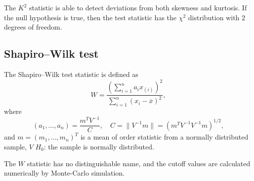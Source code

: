         \begin{remark}
            The $K^2$ statistic is able to detect deviations from both skewness and kurtosis. 
            If the null hypothesis is true, then the test statistic has the $\chi^2$ 
            distribution with $2$ degrees of freedom. 
        \end{remark}

    \subsection{Shapiro--Wilk test}
        \begin{definition}
            The Shapiro--Wilk test statistic is defined as
            \begin{equation}
                W = \frac{\left(\sum_{i=1}^n a_i x_{(i)}\right)^2 }{\sum_{i=1}^n (x_i-\overline{x})^2},
            \end{equation}
            where
            \begin{equation*}
                (a_1, \dots, a_n) = \frac{m^{T} V^{-1}}{C}, \quad C = \| V^{-1} m \| = (m^{T} V^{-1}V^{-1}m)^{1/2},
            \end{equation*}
            and $m = (m_1, \dots, m_n)^{T}$ is a mean of order statistic from a normally distributed sample, $V$ 
            $H_0$: the sample is normally distributed.
        \end{definition}

        \begin{remark}
            The $W$ statistic has no distinguishable name, and the cutoff values are calculated numerically by Monte-Carlo simulation.
        \end{remark}
